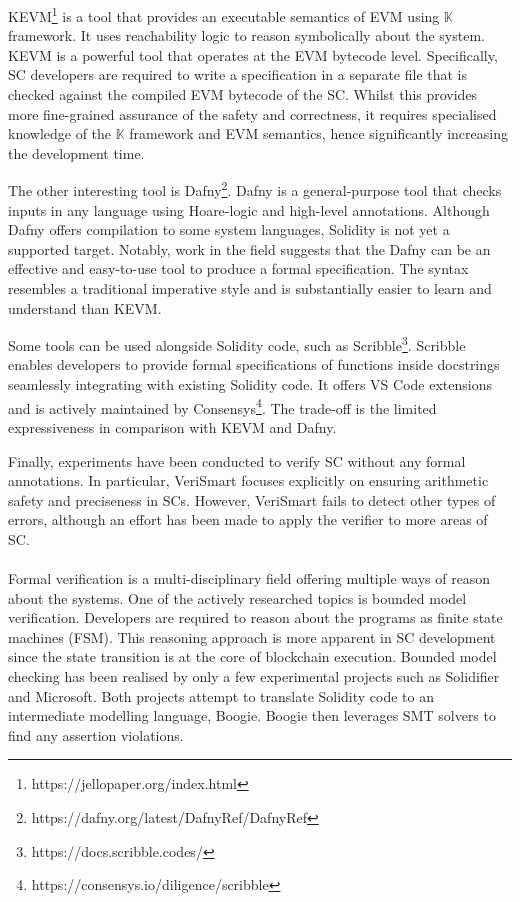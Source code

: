 \documentclass[oneside]{ecsproject}     %
\begin{document}
KEVM\footnote{https://jellopaper.org/index.html} is a tool that provides an executable semantics of EVM using $\mathbb{K}$ framework. 
It uses reachability logic to reason symbolically about the system\cite{kevm}. KEVM is a powerful tool that operates at the EVM bytecode level.
Specifically, SC developers are required to write a specification in a separate file that is checked against the compiled EVM bytecode of the SC.
Whilst this provides more fine-grained assurance of the safety and correctness, it requires specialised knowledge of the $\mathbb{K}$ framework and EVM
semantics, hence significantly increasing the development time.

The other interesting tool is Dafny\footnote{https://dafny.org/latest/DafnyRef/DafnyRef}. Dafny is a general-purpose tool that checks inputs in any language 
using Hoare-logic and high-level annotations. Although Dafny offers compilation to some system languages, Solidity is not yet a supported target. 
Notably, work in the field suggests that the Dafny can be an effective and easy-to-use tool to produce a formal specification\cite{dafny_deductive}.
The syntax resembles a traditional imperative style and is substantially easier to learn and understand than KEVM.

Some tools can be used alongside Solidity code, such as Scribble\footnote{https://docs.scribble.codes/}. 
Scribble enables developers to provide formal specifications of functions inside docstrings seamlessly integrating with existing Solidity code. 
It offers VS Code extensions and is actively maintained by Consensys\footnote{https://consensys.io/diligence/scribble}. 
The trade-off is the limited expressiveness in comparison with KEVM and Dafny.

Finally, experiments have been conducted to verify SC without any formal annotations. 
In particular, VeriSmart focuses explicitly on ensuring arithmetic safety and preciseness in SCs\cite{so2019verismart}. 
However, VeriSmart fails to detect other types of errors, 
although an effort has been made to apply the verifier to more areas of SC\cite{azure}.

\paragraph*{}
Formal verification is a multi-disciplinary field offering multiple ways of reason about the systems. One of the actively researched topics
is bounded model verification\cite{SMBC}. Developers are required to reason about the programs as finite state machines (FSM)\cite{model_fsm}.
This reasoning approach is more apparent in SC development since the state transition is at the core of blockchain execution.
Bounded model checking has been realised by only a few experimental projects such as Solidifier\cite{solidifer} and Microsoft\cite{azure}.
Both projects attempt to translate Solidity code to an intermediate modelling language, Boogie\cite{boogie}. Boogie then leverages
SMT solvers to find any assertion violations.
\end{document}
